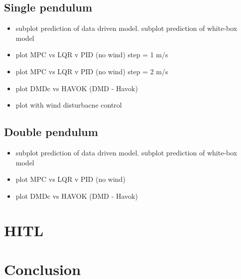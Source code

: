         \FloatBarrier\subsection{Single pendulum}

            \begin{itemize}
                \item subplot prediction of data driven model. subplot prediction of white-box model
                \item plot \gls{MPC} vs \gls{LQR} v \gls{PID} (no wind) step = 1 m/s
                \item plot \gls{MPC} vs \gls{LQR} v \gls{PID} (no wind) step = 2 m/s
                \item plot \gls{DMDc} vs \gls{HAVOK} (\gls{DMD} - Havok)
                \item plot with wind disturbacne control
            \end{itemize}

        \FloatBarrier\subsection{Double pendulum}

            \begin{itemize}
                \item subplot prediction of data driven model. subplot prediction of white-box model
                \item plot \gls{MPC} vs \gls{LQR} v \gls{PID} (no wind)
                \item plot \gls{DMDc} vs \gls{HAVOK} (\gls{DMD} - Havok)
            \end{itemize}

    \section{HITL}

    \section{Conclusion}


